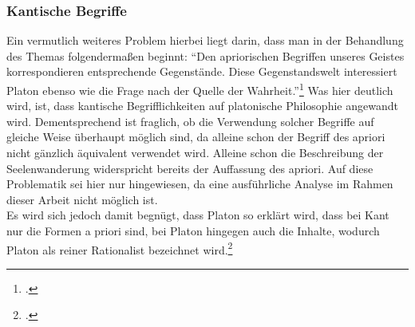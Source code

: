\subsubsection{Kantische Begriffe}
Ein vermutlich weiteres Problem hierbei liegt darin, dass man in der Behandlung des Themas folgendermaßen beginnt: \enquote{Den apriorischen Begriffen unseres Geistes korrespondieren entsprechende Gegenstände. Diese Gegenstandswelt interessiert Platon ebenso wie die Frage nach der Quelle der Wahrheit.}\footcite[][S. 97]{Hirschberger}
Was hier deutlich wird, ist, dass kantische Begrifflichkeiten auf platonische Philosophie angewandt wird. Dementsprechend ist fraglich, ob die Verwendung solcher Begriffe auf gleiche Weise überhaupt möglich sind, da alleine schon der Begriff des apriori nicht gänzlich äquivalent verwendet wird. Alleine schon die Beschreibung der Seelenwanderung widerspricht bereits der Auffassung des apriori. Auf diese Problematik sei hier nur hingewiesen, da eine ausführliche Analyse im Rahmen dieser Arbeit nicht möglich ist.\\Es wird sich jedoch damit begnügt, dass Platon so erklärt wird, dass bei Kant nur die Formen a priori sind, bei Platon hingegen auch die Inhalte, wodurch Platon als reiner Rationalist bezeichnet wird.\footcite[vgl.][S.96]{Hirschberger} 

